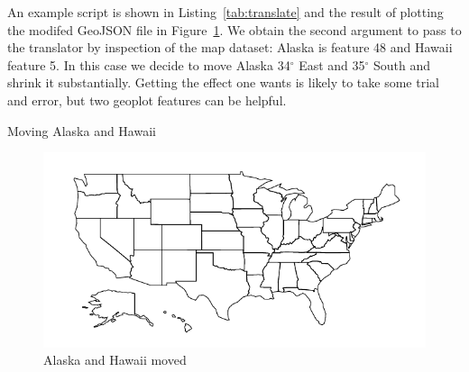 \documentclass{article}
\begin{document}
An example script is shown in Listing~\ref{tab:translate} and the
result of plotting the modifed GeoJSON file in
Figure~\ref{fig:usmod}. We obtain the second argument to pass to the
translator by inspection of the map dataset: Alaska is feature 48 and
Hawaii feature 5. In this case we decide to move Alaska 34$^{\circ}$
East and 35$^{\circ}$ South and shrink it substantially.  Getting the
effect one wants is likely to take some trial and error, but two
\textsf{geoplot} features can be helpful.

\begin{script}[p]
  \caption{Moving Alaska and Hawaii}
  \label{tab:translate}
\end{script}

\begin{figure}[p]
  \centering
  \includegraphics{usmod.pdf}
  \caption{Alaska and Hawaii moved}
  \label{fig:usmod}
\end{figure}
\end{document}
